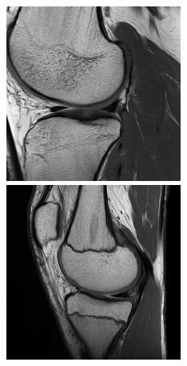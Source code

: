 \begin{figure}[H]
\endminipage\hfill
{}%
  \includegraphics[width=\linewidth]{imgs/transfer_pers_x3.png}
\endminipage\hfill
{}%
  \includegraphics[width=\linewidth]{imgs/transfer_pers_x4.png}

\end{figure}

